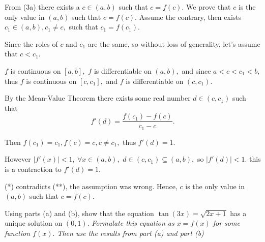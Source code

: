\documentclass{article}
\begin{document}
\begin{soln}
    From (3a) there exists a $c \in (a,b)$ such that $c = f(c).$
    We prove that $c$ is the only value in $(a,b)$ such that $c = f(c).$
    Assume the contrary, then exists $c_1 \in (a,b), c_1 \ne c,$ such that $c_1 = f(c_1).$ 
    
    Since the roles of $c$ and $c_1$ are the same, so without loss of generality, let's assume that $c < c_1.$

    $f$ is continuous on $[a,b],$ $f$ is differentiable on $(a,b),$ and since $a < c < c_1 < b,$
    thus $f$ is continuous on $[c,c_1],$ and $f$ is differentiable on $(c,c_1).$
    
    By the Mean-Value Theorem there exists some real number $d \in (c,c_1)$ such that 
    \[
        f'(d) = \frac{f(c_1) - f(c)}{c_1 - c}.
    \]

    Then $f(c_1) = c_1, f(c) = c, c\ne c_1,$ thus $f'(d) = 1.$

    However $|f'(x)| < 1,\ \forall x \in (a,b),$ $d \in (c,c_1) \subseteq (a,b),$ so $|f'(d)| < 1.$
    this is a contraction to $f'(d) = 1.$
    
    (*) contradicts (**), the assumption was wrong.
    Hence, $c$ is the only value in $(a,b)$ such that $c = f(c).$
\end{soln}

\newpage

\begin{problem*}[3c]
    Using parts (a) and (b), show that the equation $\tan(3x) = \sqrt{2x + 1}$ has a unique solution on $(0, 1).$
    \textit{Formulate this equation as $x = f(x)$ for some function $f(x).$ Then use the results from part (a) and part (b)}
\end{problem*}
\end{document}
